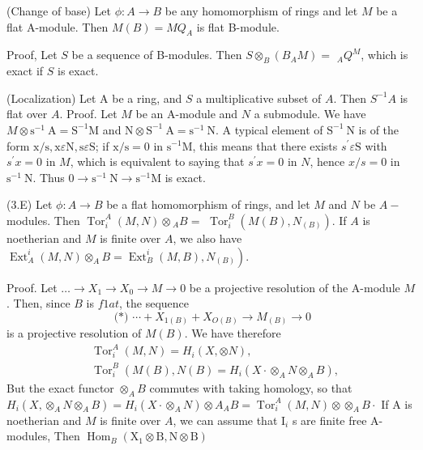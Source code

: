 (Change of base) Let $\phi: A \rightarrow B$ be any homomorphism of rings and let $M$ be a flat A-module. Then $M(B)=M Q_{A}$ is flat B-module.

Proof, Let $S$ be a sequence of B-modules. Then $S \otimes_{B}\left(B_{A} M\right)=$ ${ }_{A} Q^{M}$, which is exact if $S$ is exact.

(Localization) Let A be a ring, and $S$ a multiplicative subset of $A$. Then $S^{-1} A$ is flat over $A$. Proof. Let $M$ be an A-module and $N$ a submodule. We have $M \otimes \mathrm{s}^{-1} \mathrm{~A}=\mathrm{S}^{-1} \mathrm{M}$ and $\mathrm{N} \otimes \mathrm{S}^{-1} \mathrm{~A}=\mathrm{s}^{-1} \mathrm{~N}$. A typical element of $\mathrm{S}^{-1} \mathrm{~N}$ is of the form $\mathrm{x} / \mathrm{s}, \mathrm{x} \varepsilon \mathrm{N}, \mathrm{s} \varepsilon \mathrm{S}$; if $\mathrm{x} / \mathrm{s}=0$ in $\mathrm{s}^{-1} \mathrm{M}$, this means that there exists $s^{\prime} \varepsilon \mathrm{S}$ with $s^{\prime} x=0$ in $M$, which is equivalent to saying that $s^{\prime} x=0$ in $N$, hence $x / s=0$ in $\mathrm{s}^{-1} \mathrm{~N}$. Thus $0 \rightarrow \mathrm{s}^{-1} \mathrm{~N} \rightarrow \mathrm{s}^{-1} \mathrm{M}$ is exact.

(3.E) Let $\phi: A \rightarrow B$ be a flat homomorphism of rings, and let $M$ and $N$ be $A-$ modules. Then $\operatorname{Tor}_{i}^{A}(M, N) \otimes{ }_{A} B=$ $\operatorname{Tor}_{i}^{B}\left(M(B), N_{(B)}\right)$. If $A$ is noetherian and $M$ is finite over $A$, we also have $\left.\operatorname{Ext}_{A}^{i}(M, N) \otimes_{A} B=\operatorname{Ext}_{B}^{i}(M, B), N_{(B)}\right)$.

Proof. Let $\ldots \rightarrow X_{1} \rightarrow X_{0} \rightarrow M \rightarrow 0$ be a projective resolution of the A-module $M$. Then, since $B$ is $f 1 a t$, the sequence
$$
\text { (*) } \cdots+X_{1(B)}+X_{O(B)} \rightarrow M_{(B)} \rightarrow 0
$$
is a projective resolution of $M(B)$. We have therefore
$$
\begin{aligned}
&\operatorname{Tor}_{i}^{A}(M, N)=H_{i}(X, \otimes N), \\
&\operatorname{Tor}_{i}^{B}\left(M(B), N(B)=H_{i}\left(X \cdot \otimes_{A} N \otimes_{A} B\right),\right.
\end{aligned}
$$
But the exact functor $\otimes_{A} B$ commutes with taking homology, so that $H_{i}\left(X, \otimes_{A} N \otimes_{A} B\right)=H_{i}\left(X \cdot \otimes_{A} N\right) \otimes A_{A} B=\operatorname{Tor}_{i}^{A}(M, N) \otimes \otimes_{A} B \cdot$ If A is noetherian and $M$ is finite over $A$, we can assume that $\mathrm{I}_{i}$ s are finite free A-modules, Then $\operatorname{Hom}_{B}\left(\mathrm{X}_{1} \otimes \mathrm{B}, \mathrm{N} \otimes \mathrm{B}\right)$


